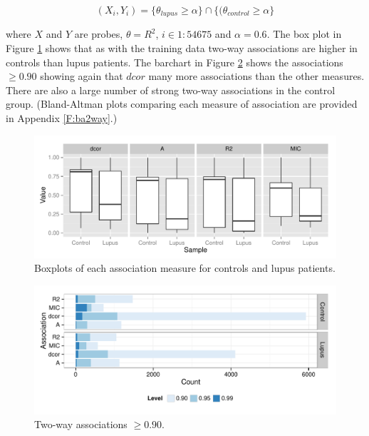 \documentclass[a4paper, 12pt]{report}
\begin{document}
\[
(X_i, Y_i) = \{\theta_{lupus} \ge \alpha \} \cap \{ (\theta_{control}  \ge \alpha \}
\]

where $X$ and $Y$ are probes, $\theta = R^2$, $i \in {1:54675}$ and $\alpha = 0.6$. The box plot in Figure \ref{F:bigBox} shows that as with the training data two-way associations are higher in controls than lupus patients. The barchart in Figure \ref{F:bigLevels} shows the associations $\ge 0.90$ showing again that $dcor$ many more associations than the other measures. There are also a large number of strong two-way associations in the control group. (Bland-Altman plots comparing each measure of association are provided in Appendix \ref{F:ba2way}.)


\begin{figure}[h]
\begin{centering}
\includegraphics[width=\textwidth]{bigBox.pdf}
\caption{Boxplots of each association measure for controls and lupus patients.} 
\label{F:bigBox}
\end{centering}
\end{figure}




\begin{figure}[h]
\begin{centering}
\includegraphics[width=\textwidth]{bigBar.pdf}
\caption{Two-way associations $\ge 0.90$.} 
\label{F:bigLevels}
\end{centering}
\end{figure}
\end{document}
